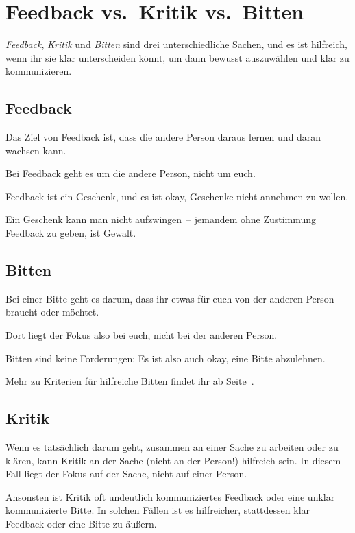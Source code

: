 \section{Feedback vs.~Kritik vs.~Bitten}
\label{feedback-vs-kritik}

\emph{Feedback}, \emph{Kritik} und \emph{Bitten} sind drei unterschiedliche Sachen, und es ist hilfreich, wenn ihr sie klar unterscheiden könnt, um dann bewusst auszuwählen und klar zu kommunizieren.


\subsection{Feedback}

Das Ziel von Feedback ist, dass die andere Person daraus lernen und daran wachsen kann.

Bei Feedback geht es um die andere Person, nicht um euch.

Feedback ist ein Geschenk, und es ist okay, Geschenke nicht annehmen zu wollen.

Ein Geschenk kann man nicht aufzwingen~-- jemandem ohne Zustimmung Feedback zu geben, ist Gewalt.


\subsection{Bitten}

Bei einer Bitte geht es darum, dass ihr etwas für euch von der anderen Person braucht oder möchtet.

Dort liegt der Fokus also bei euch, nicht bei der anderen Person.

Bitten sind keine Forderungen: Es ist also auch okay, eine Bitte abzulehnen.

Mehr zu Kriterien für hilfreiche Bitten findet ihr ab Seite~\pageref{bitten}.


\subsection{Kritik}

Wenn es tatsächlich darum geht, zusammen an einer Sache zu arbeiten oder zu klären, kann Kritik an der Sache (nicht an der Person!) hilfreich sein. In diesem Fall liegt der Fokus auf der Sache, nicht auf einer Person.

Ansonsten ist Kritik oft undeutlich kommuniziertes Feedback oder eine unklar kommunizierte Bitte. In solchen Fällen ist es hilfreicher, stattdessen klar Feedback oder eine Bitte zu äußern.

